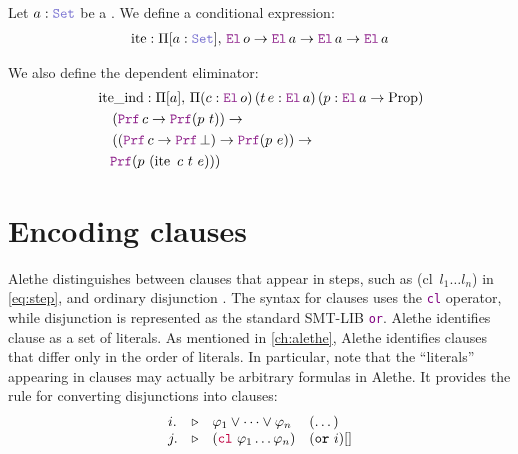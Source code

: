 \begin{definition}
Let \( a: \set \) be a \set. We define a conditional expression:
\begin{align*}
\mathop{\mathrm{ite}} : \Pi [a: \set],\, \el\,o \ra \el\,a \ra \el\,a \ra \el\,a
\end{align*}

We also define the dependent eliminator:
\begin{align*}
&\mathop{\mathrm{ite\_ind}} : \Pi [a],\, \Pi (c : \el\,o)\, (t\, e : \el\,a)\, (p : \el\,a \ra \mathrm{Prop})\\
&\quad\left( \prf\,c \ra \prf(p~t) \right) \ra \\
&\quad\left( (\prf\,c \ra \prf\,\bot) \ra \prf(p~e) \right) \ra \\
&\quad\prf(p~(\mathop{\mathrm{ite}}~c~t~e)))
\end{align*}
\end{definition}

\section{Encoding clauses}

Alethe distinguishes between clauses that appear in steps, such as \colorbox{green!30}{(cl~$l_1 \dots l_n$)} in \cref{eq:step}, and ordinary disjunction \cite[\S 4]{alethespec}.
The syntax for clauses uses the \textcolor{purple}{\texttt{cl}} operator, while disjunction is represented as the standard SMT-LIB \textcolor{purple}{\texttt{or}}.
Alethe identifies clause as a set of literals. As mentioned in \cref{ch:alethe}, Alethe identifies clauses that differ only in the order of literals. In particular, note that the ``literals'' appearing in clauses may actually be arbitrary formulas in Alethe.
It provides the  rule for converting disjunctions into clauses:
\[
\begin{matrix*}[l]
  i. & \triangleright & \varphi_1 \lor \dots \lor \varphi_n  & (\dots) \\
  j. & \triangleright & (\texttt{\textcolor{purple}{cl}}~\varphi_1 \dots \varphi_n)  & (\kw{or}~i)[] \\
\end{matrix*}
\]

